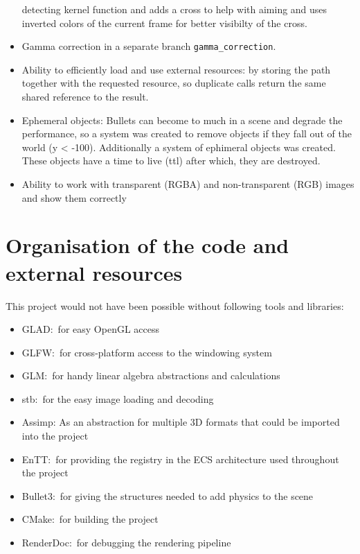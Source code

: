 \documentclass[]{article}
\begin{document}
\begin{itemize}
            detecting kernel function and adds a cross to help with aiming and uses
            inverted colors of the current frame for better visibilty of the cross.
      \item Gamma correction in a separate branch \verb|gamma_correction|.
      \item Ability to efficiently load and use external resources: by storing the
            path together with the requested resource, so duplicate calls return
            the same shared reference to the result.
      \item Ephemeral objects: Bullets can become to much in a scene and degrade
            the performance, so a system was created to remove objects if they
            fall out of the world (y < -100). Additionally a system of ephimeral
            objects was created.  These objects have a time to live (ttl) after
            which, they are destroyed.
      \item Ability to work with transparent (RGBA) and non-transparent (RGB)
            images and show them correctly
\end{itemize}

\section{Organisation of the code and external resources}

This project would not have been possible without following tools and libraries:
\begin{itemize}
      \item GLAD:\ for easy OpenGL access
      \item GLFW:\ for cross-platform access to the windowing system
      \item GLM:\ for handy linear algebra abstractions and calculations
      \item stb:\ for the easy image loading and decoding
      \item Assimp: As an abstraction for multiple 3D formats that could be
            imported into the project
      \item EnTT:\ for providing the registry in the ECS architecture used
            throughout the project
      \item Bullet3:\ for giving the structures needed to add physics to the scene
      \item CMake:\ for building the project
      \item RenderDoc:\ for debugging the rendering pipeline
\end{itemize}
\end{document}
